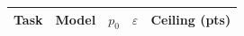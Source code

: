 \begin{tabular}{@{}ll ccc@{}}
\toprule
Task & Model & $p_0$ & $\varepsilon$ & Ceiling (pts) \\
\midrule
\bottomrule
\end{tabular}
